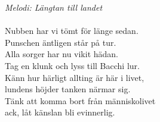 {\footnotesize\textit{Melodi: Längtan till landet}}\\
\\
Nubben har vi tömt för länge sedan.\\
Punschen äntligen står på tur.\\
Alla sorger har nu vikit hädan.\\
Tag en klunk och lyss till Bacchi lur.\\
Känn hur härligt allting är här i livet,\\
lundens höjder tanken närmar sig.\\
Tänk att komma bort från människolivet\\
ack, låt känslan bli evinnerlig.

